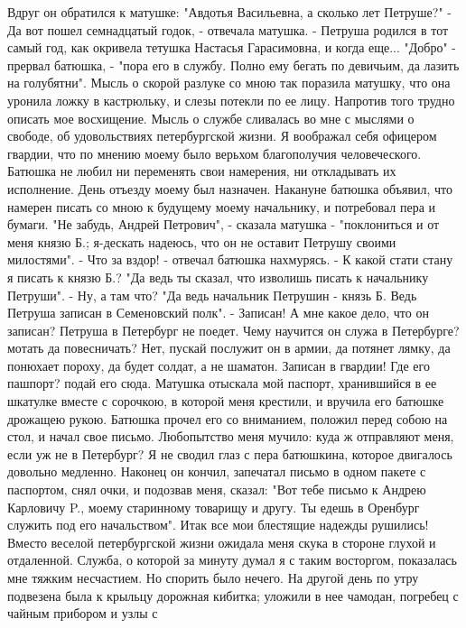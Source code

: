 Вдруг он  обратился  к  матушке:  "Авдотья Васильевна,  а  сколько  лет
Петруше?"
- Да вот пошел семнадцатый годок, - отвечала матушка. - Петруша родился
в тот самый год, как окривела тетушка Настасья Гарасимовна, и когда еще...
"Добро"  - прервал  батюшка, - "пора  его в службу. Полно ему бегать по
девичьим, да лазить на голубятни".
Мысль о скорой  разлуке со  мною  так поразила матушку, что она уронила
ложку в кастрюльку, и слезы потекли по ее лицу. Напротив того трудно описать
мое  восхищение.  Мысль  о службе сливалась во мне  с  мыслями о свободе, об
удовольствиях петербургской жизни. Я воображал себя офицером гвардии, что по
мнению моему было верьхом благополучия человеческого.
Батюшка  не  любил  ни  переменять свои намерения,  ни  откладывать  их
исполнение.  День отъезду  моему был назначен. Накануне батюшка объявил, что
намерен писать со  мною к будущему моему начальнику,  и  потребовал  пера  и
бумаги.
"Не забудь,  Андрей Петрович", -  сказала  матушка  - "поклониться и от
меня  князю  Б.;  я-дескать  надеюсь,  что  он  не  оставит  Петрушу  своими
милостями".
-  Что за вздор! - отвечал  батюшка нахмурясь.  - К какой стати стану я
писать к князю Б.?
"Да ведь ты сказал, что изволишь писать к начальнику Петруши".
- Ну, а там что?
"Да  ведь  начальник  Петрушин  -  князь  Б.  Ведь  Петруша  записан  в
Семеновский полк".
- Записан! А  мне  какое дело,  что он записан? Петруша в Петербург  не
поедет. Чему  научится он  служа  в  Петербурге? мотать да повесничать? Нет,
пускай  послужит он в армии, да потянет лямку,  да понюхает пороху, да будет
солдат, а не шаматон. Записан в гвардии! Где его пашпорт? подай его сюда.
Матушка  отыскала  мой  паспорт,  хранившийся  в ее  шкатулке  вместе с
сорочкою, в  которой меня  крестили, и вручила  его батюшке  дрожащею рукою.
Батюшка прочел его  со вниманием, положил перед собою на стол, и начал  свое
письмо.
Любопытство  меня  мучило:  куда  ж  отправляют  меня,  если  уж  не  в
Петербург? Я не  сводил глаз с  пера батюшкина,  которое двигалось  довольно
медленно. Наконец он кончил,  запечатал письмо в одном  пакете  с паспортом,
снял очки, и подозвав меня, сказал: "Вот тебе письмо к  Андрею Карловичу P.,
моему старинному  товарищу и  другу. Ты едешь  в Оренбург  служить  под  его
начальством".
Итак все мои блестящие надежды  рушились! Вместо  веселой петербургской
жизни ожидала меня скука в стороне глухой и отдаленной. Служба, о которой за
минуту  думал  я  с  таким восторгом, показалась  мне тяжким  несчастием. Но
спорить было  нечего.  На  другой день  по  утру  подвезена  была  к крыльцу
дорожная кибитка; уложили в нее чамодан, погребец с чайным прибором и узлы с
